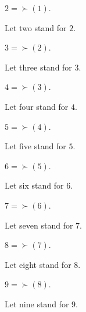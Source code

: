 \documentclass[../arithmetic.tex]{subfiles}
\begin{document}
  \begin{forthel}
    \begin{definition}
      $2 = \succ(1)$.
    \end{definition}

    Let two stand for $2$.
  \end{forthel}

  \begin{forthel}
    \begin{definition}
      $3 = \succ(2)$.
    \end{definition}

    Let three stand for $3$.
  \end{forthel}

  \begin{forthel}
    \begin{definition}
      $4 = \succ(3)$.
    \end{definition}

    Let four stand for $4$.
  \end{forthel}

  \begin{forthel}
    \begin{definition}
      $5 = \succ(4)$.
    \end{definition}

    Let five stand for $5$.
  \end{forthel}

  \begin{forthel}
    \begin{definition}
      $6 = \succ(5)$.
    \end{definition}

    Let six stand for $6$.
  \end{forthel}

  \begin{forthel}
    \begin{definition}
      $7 = \succ(6)$.
    \end{definition}

    Let seven stand for $7$.
  \end{forthel}

  \begin{forthel}
    \begin{definition}
      $8 = \succ(7)$.
    \end{definition}

    Let eight stand for $8$.
  \end{forthel}

  \begin{forthel}
    \begin{definition}
      $9 = \succ(8)$.
    \end{definition}

    Let nine stand for $9$.
  \end{forthel}
\end{document}

